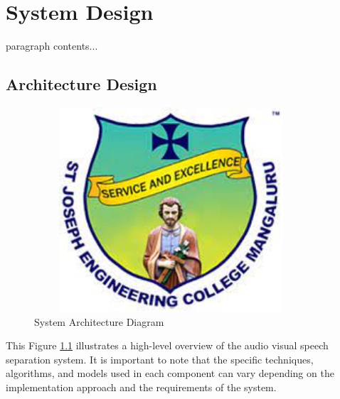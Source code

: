 \documentclass[12pt,a4paper]{report}
\begin{document}


\chapter{System Design}
paragraph contents... 
\section{Architecture Design}
\begin{figure}[hbtp]
\centering
\includegraphics[width=4in,height=3in]{./pic/sjeclogo.png}
\caption{System Architecture Diagram}
\label{fig:1}
\end{figure}
This Figure \ref{fig:1} illustrates a high-level overview of the audio visual speech separation system. It is important to note that the specific techniques, algorithms, and models used in each component can vary depending on the implementation approach and the requirements of the system.
\end{document}
